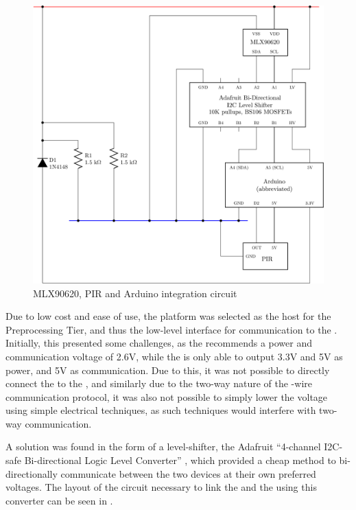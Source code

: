 \documentclass[../thesis/thesis.tex]{subfiles}
\begin{document}
\begin{figure}
\centering
\includegraphics[width=\textwidth]{../diagrams/mlx-arduino2.pdf}
\caption{MLX90620, PIR and Arduino integration circuit}
\label{fig:circuits:node}
\end{figure}

Due to low cost and ease of use, the \ard platform was selected as the host for the Preprocessing Tier, and thus the low-level \iic interface for communication to the \mlx. Initially, this presented some challenges, as the \mlx recommends a power and communication voltage of 2.6V, while the \ard is only able to output 3.3V and 5V as power, and 5V as communication. Due to this, it was not possible to directly connect the \ard to the \mlx, and similarly due to the two-way nature of the -wire communication protocol, it was also not possible to simply lower the \ard voltage using simple electrical techniques, as such techniques would interfere with two-way communication.

A solution was found in the form of a \iic level-shifter, the Adafruit ``4-channel I2C-safe Bi-directional Logic Level Converter'' \cite{AdafruitI2C}, which provided a cheap method to bi-directionally communicate between the two devices at their own preferred voltages. The layout of the circuit necessary to link the \ard and the \mlx using this converter can be seen in .
\end{document}
